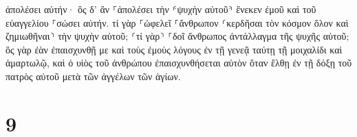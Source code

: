 \documentclass{openreader}
\begin{document}
ἀπολέσει αὐτήν· ὃς δ’ ἂν ⸀ἀπολέσει τὴν ⸄ψυχὴν αὐτοῦ⸅ ἕνεκεν ἐμοῦ καὶ τοῦ εὐαγγελίου ⸀σώσει αὐτήν. τί γὰρ ⸀ὠφελεῖ ⸀ἄνθρωπον ⸂κερδῆσαι τὸν κόσμον ὅλον καὶ ζημιωθῆναι⸃ τὴν ψυχὴν αὐτοῦ; ⸂τί γὰρ⸃ ⸀δοῖ ἄνθρωπος ἀντάλλαγμα τῆς ψυχῆς αὐτοῦ; ὃς γὰρ ἐὰν ἐπαισχυνθῇ με καὶ τοὺς ἐμοὺς λόγους ἐν τῇ γενεᾷ ταύτῃ τῇ μοιχαλίδι καὶ ἁμαρτωλῷ, καὶ ὁ υἱὸς τοῦ ἀνθρώπου ἐπαισχυνθήσεται αὐτὸν ὅταν ἔλθῃ ἐν τῇ δόξῃ τοῦ πατρὸς αὐτοῦ μετὰ τῶν ἀγγέλων τῶν ἁγίων. \section*{9}
\end{document}
